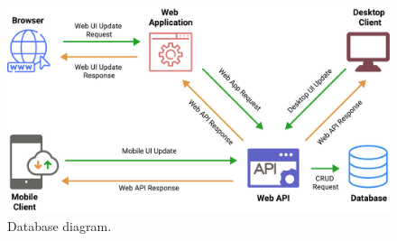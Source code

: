 \begin{figure}[H]
    \centering
    \includegraphics[width=1.2\textwidth]{Pictures/Threat_Modeling}
    \caption{Database diagram.}\label{fig:figure6}
\end{figure}

